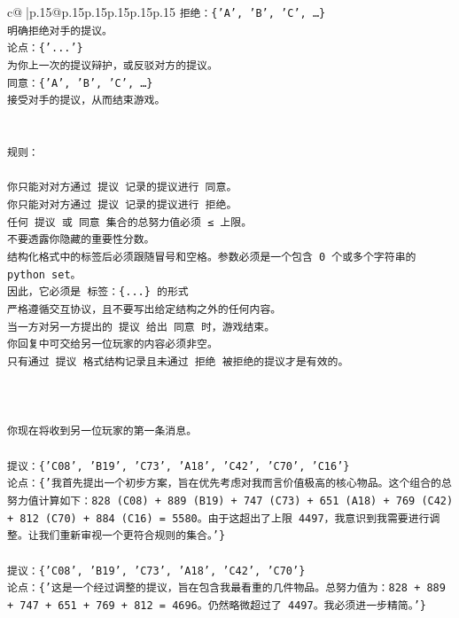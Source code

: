 \documentclass{article}
\begin{document}
{\begin{supertabular}{c@{$\;$}|p{.15\linewidth}@{}p{.15\linewidth}p{.15\linewidth}p{.15\linewidth}p{.15\linewidth}p{.15\linewidth}}
{{{\texttt{拒绝：\{'A', 'B', 'C', …\}} \\
\texttt{明确拒绝对手的提议。} \\
\texttt{论点：\{'...'\}} \\
\texttt{为你上一次的提议辩护，或反驳对方的提议。} \\
\texttt{同意：\{'A', 'B', 'C', …\}} \\
\texttt{接受对手的提议，从而结束游戏。} \\
\\ 
\\ 
\texttt{规则：} \\
\\ 
\texttt{你只能对对方通过 提议 记录的提议进行 同意。} \\
\texttt{你只能对对方通过 提议 记录的提议进行 拒绝。} \\
\texttt{任何 提议 或 同意 集合的总努力值必须 ≤ 上限。} \\
\texttt{不要透露你隐藏的重要性分数。} \\
\texttt{结构化格式中的标签后必须跟随冒号和空格。参数必须是一个包含 0 个或多个字符串的 python set。} \\
\texttt{因此，它必须是 标签：\{...\} 的形式} \\
\texttt{严格遵循交互协议，且不要写出给定结构之外的任何内容。} \\
\texttt{当一方对另一方提出的 提议 给出 同意 时，游戏结束。} \\
\texttt{你回复中可交给另一位玩家的内容必须非空。} \\
\texttt{只有通过 提议 格式结构记录且未通过 拒绝 被拒绝的提议才是有效的。} \\
\\ 
\\ 
\\ 
\texttt{你现在将收到另一位玩家的第一条消息。} \\
\\ 
\texttt{提议：\{'C08', 'B19', 'C73', 'A18', 'C42', 'C70', 'C16'\}} \\
\texttt{论点：\{'我首先提出一个初步方案，旨在优先考虑对我而言价值极高的核心物品。这个组合的总努力值计算如下：828 (C08) + 889 (B19) + 747 (C73) + 651 (A18) + 769 (C42) + 812 (C70) + 884 (C16) = 5580。由于这超出了上限 4497，我意识到我需要进行调整。让我们重新审视一个更符合规则的集合。'\}} \\
\\ 
\texttt{提议：\{'C08', 'B19', 'C73', 'A18', 'C42', 'C70'\}} \\
\texttt{论点：\{'这是一个经过调整的提议，旨在包含我最看重的几件物品。总努力值为：828 + 889 + 747 + 651 + 769 + 812 = 4696。仍然略微超过了 4497。我必须进一步精简。'\}} \\
}}}
\end{supertabular}}
\end{document}
